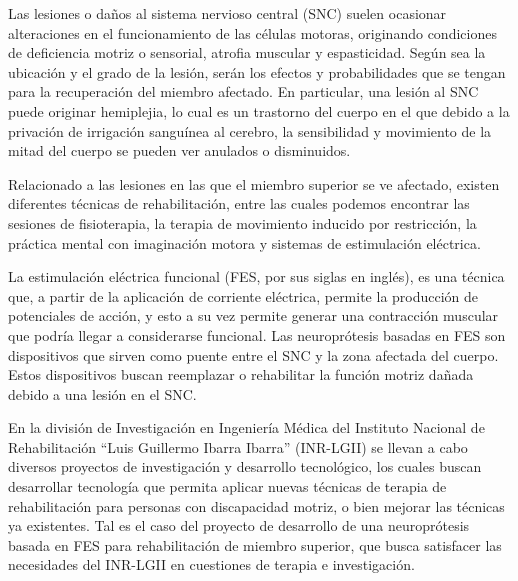 Las lesiones o daños al sistema nervioso central (SNC) suelen ocasionar alteraciones en el funcionamiento de las células motoras, originando condiciones de deficiencia motriz o sensorial, atrofia muscular y espasticidad. Según sea la ubicación y el grado de la lesión, serán los efectos y probabilidades que se tengan para la recuperación del miembro afectado. En particular, una lesión al SNC puede originar hemiplejia, lo cual es un trastorno del cuerpo en el que debido a la privación de irrigación sanguínea al cerebro, la sensibilidad y movimiento de la mitad del cuerpo se pueden ver anulados o disminuidos.


Relacionado a las lesiones en las que el miembro superior se ve afectado, existen diferentes técnicas de rehabilitación, entre las cuales podemos encontrar las sesiones de fisioterapia, la terapia de movimiento inducido por restricción, la práctica mental con imaginación motora y sistemas de estimulación eléctrica.

La estimulación eléctrica funcional (FES, por sus siglas en inglés), es una técnica que, a partir de la aplicación de corriente eléctrica, permite la producción de potenciales de acción, y esto a su vez permite generar una contracción muscular que podría llegar a considerarse funcional\cite{Peckham2005}. Las neuroprótesis basadas en FES son dispositivos que sirven como puente entre el SNC y la zona afectada del cuerpo. Estos dispositivos buscan reemplazar o rehabilitar la función motriz dañada debido a una lesión en el SNC.

En la división de Investigación en Ingeniería Médica del Instituto Nacional de Rehabilitación ``Luis Guillermo Ibarra Ibarra'' (INR-LGII) se llevan a cabo diversos proyectos de investigación y desarrollo tecnológico, los cuales buscan desarrollar tecnología que permita aplicar nuevas técnicas de terapia de rehabilitación para personas con discapacidad motriz, o bien mejorar las técnicas ya existentes. Tal es el caso del proyecto de desarrollo de una neuroprótesis basada en FES para rehabilitación de miembro superior, que busca satisfacer las necesidades del INR-LGII en cuestiones de terapia e investigación.

